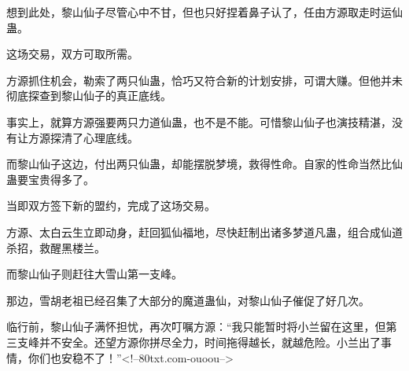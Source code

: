 \begin{this_body}
想到此处，黎山仙子尽管心中不甘，但也只好捏着鼻子认了，任由方源取走时运仙蛊。

这场交易，双方可取所需。

方源抓住机会，勒索了两只仙蛊，恰巧又符合新的计划安排，可谓大赚。但他并未彻底探查到黎山仙子的真正底线。

事实上，就算方源强要两只力道仙蛊，也不是不能。可惜黎山仙子也演技精湛，没有让方源探清了心理底线。

而黎山仙子这边，付出两只仙蛊，却能摆脱梦境，救得性命。自家的性命当然比仙蛊要宝贵得多了。

当即双方签下新的盟约，完成了这场交易。

方源、太白云生立即动身，赶回狐仙福地，尽快赶制出诸多梦道凡蛊，组合成仙道杀招，救醒黑楼兰。

而黎山仙子则赶往大雪山第一支峰。

那边，雪胡老祖已经召集了大部分的魔道蛊仙，对黎山仙子催促了好几次。

临行前，黎山仙子满怀担忧，再次叮嘱方源：“我只能暂时将小兰留在这里，但第三支峰并不安全。还望方源你拼尽全力，时间拖得越长，就越危险。小兰出了事情，你们也安稳不了！”<!--80txt.com-ouoou-->

\end{this_body}

